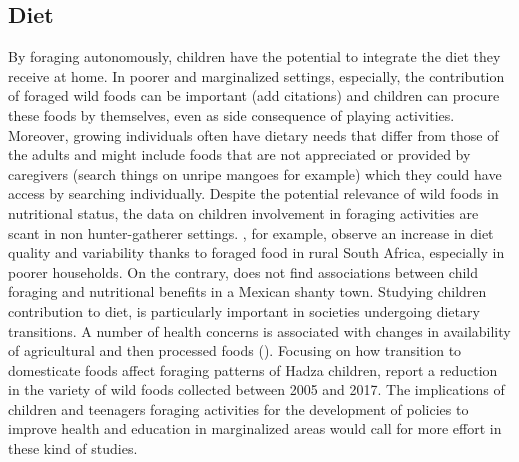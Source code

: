 \subsection{Diet}
By foraging autonomously, children have the potential to integrate the diet they receive at home. In poorer and marginalized settings, especially, the contribution of foraged wild foods can be important (add citations) and children can procure these foods by themselves, even as side consequence of playing activities. Moreover, growing individuals often have dietary needs that differ from those of the adults and might include foods that are not appreciated or provided by caregivers (search things on unripe mangoes for example) which they could have access by searching individually.  
Despite the potential relevance of wild foods in nutritional status, the data on children involvement in foraging activities are scant in non hunter-gatherer settings. 
\cite{mcgarry_children_2009}, for example, observe an increase in diet quality and variability thanks to foraged food in rural South Africa, especially in poorer households. On the contrary, \cite{lee_childrens_2009} does not find associations between child foraging and nutritional benefits in a Mexican shanty town. 
Studying children contribution to diet, is particularly important in societies undergoing dietary transitions. A number of health concerns is associated with changes in availability of agricultural and then processed foods (\cite{satia_dietary_2010}). Focusing on how transition to domesticate foods affect foraging patterns of Hadza children, \cite{pollom_changes_2020} report a reduction in the variety of wild foods collected between 2005 and 2017. 
The implications of children and teenagers foraging activities for the development of policies to improve health and education in marginalized areas would call for more effort in these kind of studies.



